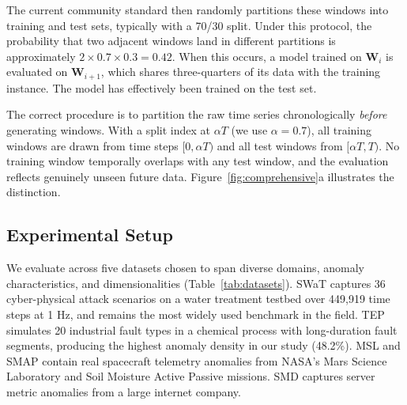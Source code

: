 \documentclass[preprint,12pt]{elsarticle}
\begin{document}
The current community standard then randomly partitions these windows into training and test sets, typically with a 70/30 split. Under this protocol, the probability that two adjacent windows land in different partitions is approximately $2 \times 0.7 \times 0.3 = 0.42$. When this occurs, a model trained on $\mathbf{W}_i$ is evaluated on $\mathbf{W}_{i+1}$, which shares three-quarters of its data with the training instance. The model has effectively been trained on the test set.

The correct procedure is to partition the raw time series chronologically \emph{before} generating windows. With a split index at $\alpha T$ (we use $\alpha = 0.7$), all training windows are drawn from time steps $[0, \alpha T)$ and all test windows from $[\alpha T, T)$. No training window temporally overlaps with any test window, and the evaluation reflects genuinely unseen future data. Figure~\ref{fig:comprehensive}a illustrates the distinction.


\subsection{Experimental Setup}

We evaluate across five datasets chosen to span diverse domains, anomaly characteristics, and dimensionalities (Table~\ref{tab:datasets}). SWaT \cite{swat2016} captures 36 cyber-physical attack scenarios on a water treatment testbed over 449,919 time steps at 1 Hz, and remains the most widely used benchmark in the field. TEP \cite{tep1993} simulates 20 industrial fault types in a chemical process with long-duration fault segments, producing the highest anomaly density in our study (48.2\%). MSL and SMAP \cite{hunman2018} contain real spacecraft telemetry anomalies from NASA's Mars Science Laboratory and Soil Moisture Active Passive missions. SMD \cite{su2019} captures server metric anomalies from a large internet company.

\begin{table}[htbp]
\centering
\small\setlength{\tabcolsep}{4pt}
\caption{Dataset characteristics. All datasets use window length $L=256$, stride $S=64$. Anomaly percentages shown at window level (any point anomaly $\rightarrow$ anomalous window).}
\label{tab:datasets}
\end{table}
\end{document}
